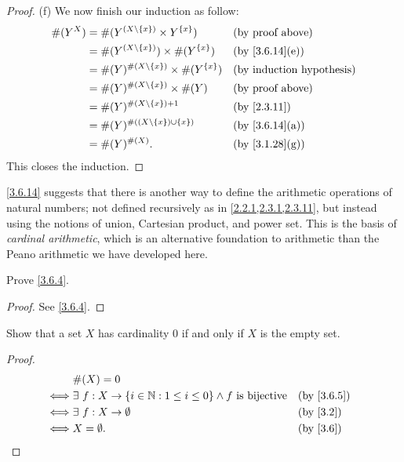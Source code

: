 \begin{proof}{(f)}
  We now finish our induction as follow:
  \begin{align*}
    \#(Y^X) & = \#(Y^{(X \setminus \{x\})} \times Y^{\{x\}})       &  & \text{(by proof above)}          \\
            & = \#(Y^{(X \setminus \{x\})}) \times \#(Y^{\{x\}})   &  & \text{(by \cref{3.6.14}(e))}     \\
            & = \#(Y)^{\#(X \setminus \{x\})} \times \#(Y^{\{x\}}) &  & \text{(by induction hypothesis)} \\
            & = \#(Y)^{\#(X \setminus \{x\})} \times \#(Y)         &  & \text{(by proof above)}          \\
            & = \#(Y)^{\#(X \setminus \{x\}) + 1}                  &  & \text{(by \cref{2.3.11})}        \\
            & = \#(Y)^{\#((X \setminus \{x\}) \cup \{x\})}         &  & \text{(by \cref{3.6.14}(a))}     \\
            & = \#(Y)^{\#(X)}.                                     &  & \text{(by \cref{3.1.28}(g))}
  \end{align*}
  This closes the induction.
\end{proof}

\begin{rmk}\label{3.6.15}
  \cref{3.6.14} suggests that there is another way to define the arithmetic operations of natural numbers;
  not defined recursively as in \cref{2.2.1,2.3.1,2.3.11}, but instead using the notions of union, Cartesian product, and power set.
  This is the basis of \emph{cardinal arithmetic}, which is an alternative foundation to arithmetic than the Peano arithmetic we have developed here.
\end{rmk}

\exercisesection

\begin{ex}\label{ex:3.6.1}
  Prove \cref{3.6.4}.
\end{ex}

\begin{proof}
  See \cref{3.6.4}.
\end{proof}

\begin{ex}\label{ex:3.6.2}
  Show that a set \(X\) has cardinality \(0\) if and only if \(X\) is the empty set.
\end{ex}

\begin{proof}
  \begin{align*}
         & \#(X) = 0                                                                                                    \\
    \iff & \exists\ f : X \to \{i \in \N : 1 \leq i \leq 0\} \land f \text{ is bijective} &  & \text{(by \cref{3.6.5})} \\
    \iff & \exists\ f : X \to \emptyset                                                   &  & \text{(by \cref{3.2})}   \\
    \iff & X = \emptyset.                                                                 &  & \text{(by \cref{3.6})}
  \end{align*}
\end{proof}

